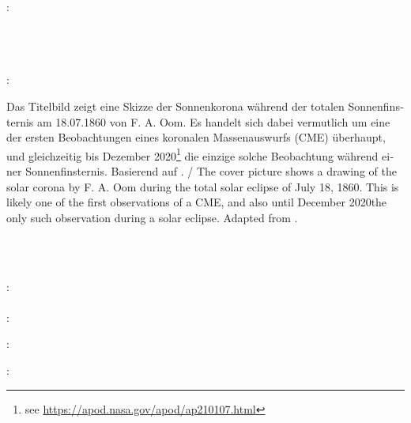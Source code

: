 \thispagestyle{empty}

\hfill

\vfill

\noindent\myName:\\
\textit{\myTitle \\ \mySubtitle} \\%
\textcopyright\ \myTime

\vspace{1cm}

\noindent{}: \\[2mm]
\begin{minipage}{\textwidth}
\renewcommand{\thempfootnote}{\arabic{mpfootnote}}
{\footnotesize \foreignlanguage{ngerman}{Das Titelbild zeigt eine Skizze der Sonnenkorona während der totalen Sonnenfinsternis am 18.07.1860 von F. A. Oom. Es handelt sich dabei vermutlich um eine der ersten Beobachtungen eines koronalen Massenauswurfs (\acs{CME}) überhaupt, und gleichzeitig bis Dezember 2020\footnote{see \url{https://apod.nasa.gov/apod/ap210107.html}} die einzige solche Beobachtung während einer Sonnenfinsternis. Basierend auf \citet[S. 551]{Ranyard-1879}.}  /
The cover picture shows a drawing of the solar corona by F. A. Oom during the total solar eclipse of July 18, 1860. This is likely one of the first observations of a \ac{CME}, and also until December 2020\footnotemark[1] the only such observation during a solar eclipse. Adapted from \citet[page 551]{Ranyard-1879}.}
\end{minipage}\\\

\vspace{1cm}

\noindent{}: \\
\myProf \\

\noindent{}: \\



\vspace{1cm}

\noindent{}: \\

\bigskip

\noindent{}: \\

\vspace{1cm}

